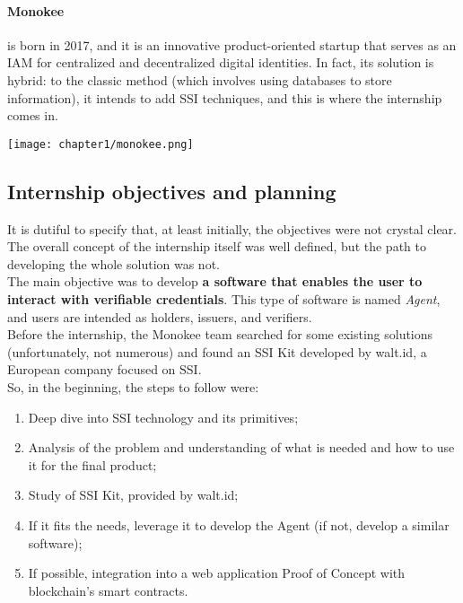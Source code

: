     \paragraph{Monokee} is born in 2017, and it is an innovative product-oriented 
    startup that serves as an IAM for centralized and decentralized digital 
    identities. In fact, its solution is hybrid: to the classic method (which 
    involves using databases to store information), it intends to add SSI techniques,
    and this is where the internship comes in.
    \begin{center}
        \texttt{[image: chapter1/monokee.png]}
        \vspace{-0.35cm}
    \end{center}
\subsection{Internship objectives and planning}
It is dutiful to specify that, at least initially, the objectives were not crystal 
clear. The overall concept of the internship itself was well defined, but the path 
to developing the whole solution was not.\\
The main objective was to develop \textbf{a software that enables the user to interact 
with verifiable credentials}. This type of software is named \textit{Agent}, and 
users are intended as holders, issuers, and verifiers.\\
Before the internship, the Monokee team searched for some existing solutions 
(unfortunately, not numerous) and found an SSI Kit developed by walt.id, a European 
company focused on SSI.
\vspace*{0.3cm}\\
So, in the beginning, the steps to follow were:
\begin{enumerate}
    \item Deep dive into SSI technology and its primitives;
    \item Analysis of the problem and understanding of what is needed and how to use it
    for the final product;
    \item Study of SSI Kit, provided by walt.id;
    \item If it fits the needs, leverage it to develop the Agent (if not, develop
    a similar software);
    \item If possible, integration into a web application Proof of Concept with
    blockchain's smart contracts.
\end{enumerate}
